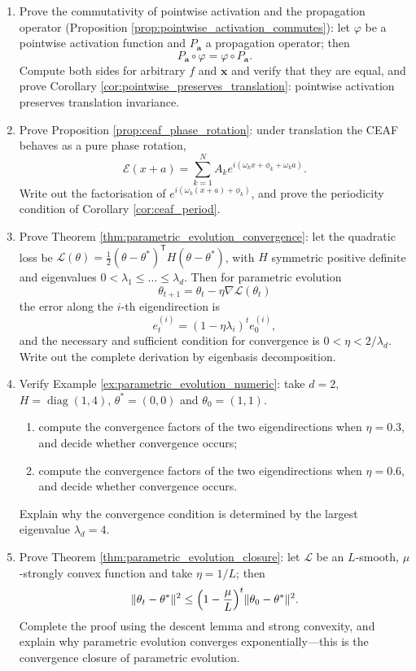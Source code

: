 \begin{enumerate}[leftmargin=3em, label=\textbf{Exercise \arabic*}]
    \item Prove the commutativity of pointwise activation and the propagation operator (Proposition \ref{prop:pointwise_activation_commutes}):
    let $\varphi$ be a pointwise activation function and $P_{\mathbf{a}}$ a propagation operator; then
    \[
    P_{\mathbf{a}}\circ\varphi=\varphi\circ P_{\mathbf{a}}.
    \]
    Compute both sides for arbitrary $f$ and $\mathbf{x}$ and verify that they are equal,
    and prove Corollary \ref{cor:pointwise_preserves_translation}:
    pointwise activation preserves translation invariance.

    \item Prove Proposition \ref{prop:ceaf_phase_rotation}:
    under translation the CEAF behaves as a pure phase rotation,
    \[
    \mathcal{E}(x+a)=\sum_{k=1}^{N}A_ke^{i(\omega_kx+\phi_k+\omega_ka)}.
    \]
    Write out the factorisation of $e^{i(\omega_k(x+a)+\phi_k)}$,
    and prove the periodicity condition of Corollary \ref{cor:ceaf_period}.

    \item Prove Theorem \ref{thm:parametric_evolution_convergence}:
    let the quadratic loss be $\mathcal{L}(\theta)=\frac12(\theta-\theta^*)^{\mathsf T}H(\theta-\theta^*)$,
    with $H$ symmetric positive definite and eigenvalues $0<\lambda_1\le\dots\le\lambda_d$.
    Then for parametric evolution
    \[
    \theta_{t+1}=\theta_t-\eta\nabla\mathcal{L}(\theta_t)
    \]
    the error along the $i$-th eigendirection is
    \[
    e_t^{(i)}=(1-\eta\lambda_i)^te_0^{(i)},
    \]
    and the necessary and sufficient condition for convergence is $0<\eta<2/\lambda_d$.
    Write out the complete derivation by eigenbasis decomposition.

    \item Verify Example \ref{ex:parametric_evolution_numeric}:
    take $d=2$, $H=\operatorname{diag}(1,4)$, $\theta^*=(0,0)$ and $\theta_0=(1,1)$.
    \begin{enumerate}[label=(\roman*)]
        \item compute the convergence factors of the two eigendirections when $\eta=0.3$, and decide whether convergence occurs;
        \item compute the convergence factors of the two eigendirections when $\eta=0.6$, and decide whether convergence occurs.
    \end{enumerate}
    Explain why the convergence condition is determined by the largest eigenvalue $\lambda_d=4$.

    \item Prove Theorem \ref{thm:parametric_evolution_closure}:
    let $\mathcal{L}$ be an $L$-smooth, $\mu$-strongly convex function and take $\eta=1/L$; then
    \[
    \|\theta_t-\theta^*\|^2
    \le\Bigl(1-\frac{\mu}{L}\Bigr)^t\|\theta_0-\theta^*\|^2.
    \]
    Complete the proof using the descent lemma and strong convexity,
    and explain why parametric evolution converges exponentially---this is the convergence closure of parametric evolution.


\end{enumerate}
